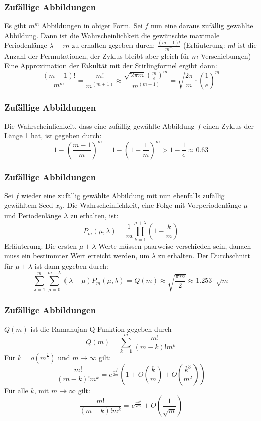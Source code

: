 \documentclass{beamer}
\begin{document}

\begin{frame}
	\frametitle{Zufällige Abbildungen}
	Es gibt \(m^m\) Abbildungen in obiger Form.
	Sei \(f\) nun eine daraus zufällig gewählte Abbildung.
	Dann ist die Wahrscheinlichkeit die gewünschte maximale Periodenlänge \(\lambda=m\) zu erhalten gegeben durch: \(\frac{(m-1)!}{m^m}\)
	(Erläuterung: \(m!\) ist die Anzahl der Permutationen, der Zyklus bleibt aber gleich für \(m\) Verschiebungen) \\
	Eine Approximation der Fakultät mit der Stirlingformel ergibt dann:
	\[
		\frac{(m-1)!}{m^m} = \frac{m!}{m^{(m+1)}} \approx \frac{\sqrt{2 \pi m} \left(\frac{m}{e}\right)^m}{m^{(m+1)}} = \sqrt{\frac{2 \pi}{m}} \cdot \left(\frac{1}e\right)^m
	\]
\end{frame}

\begin{frame}
	\frametitle{Zufällige Abbildungen}
	Die Wahrscheinlichkeit, dass eine zufällig gewählte Abbildung \(f\) einen Zyklus der Länge 1 hat, ist gegeben durch:
	\[
		1-\left(\frac{m-1}{m}\right)^m = 1-\left(1-\frac{1}{m}\right)^m >  1 - \frac{1}{e} \approx 0.63
	\]
\end{frame}


\begin{frame}
	\frametitle{Zufällige Abbildungen}
	Sei \(f\) wieder eine zufällig gewählte Abbildung mit nun ebenfalls zufällig gewähltem Seed \(x_0\).
	Die Wahrscheinlichkeit, eine Folge mit Vorperiodenlänge \(\mu\) und Periodenlänge \(\lambda\) zu erhalten, ist:
	\[
		P_m(\mu,\lambda)=\frac{1}{m}\prod_{k=1}^{\mu + \lambda}\left(1-\frac{k}{m}\right)
	\]
	Erläuterung:
	Die ersten \(\mu + \lambda\) Werte müssen paarweise verschieden sein,
	danach muss ein bestimmter Wert erreicht werden, um \(\lambda\) zu erhalten.
	Der Durchschnitt für \(\mu + \lambda\) ist dann gegeben durch:
	\[
		\sum_{\lambda=1}^{m} \sum_{\mu=0}^{m-\lambda}  (\lambda+\mu) P_m(\mu,\lambda) = Q(m)
		\approx \sqrt{\frac{\pi m}{2}} \approx 1.253 \cdot \sqrt{m}
	\]
\end{frame}


\begin{frame}
	\frametitle{Zufällige Abbildungen}
	\(Q(m)\) ist die Ramanujan Q-Funktion gegeben durch 
	\[
		Q(m)= \sum_{k=1}^m \frac{m!}{(m-k)!m^k}
	\]
	Für \(k=o\left(m^\frac{2}{3}\right)\) und \(m \to \infty\) gilt:
	\[
		\frac{m!}{(m-k)!m^k}=e^\frac{-k^2}{2m} \left( 1 + O\left(\frac{k}{m}\right) + O\left(\frac{k^3}{m^2}\right) \right)
	\]
	Für alle \(k\), mit \(m \to \infty\) gilt:
	\[
		\frac{m!}{(m-k)!m^k}=e^\frac{-k^2}{2m} + O\left(\frac{1}{\sqrt{m}}\right)
	\]
\end{frame}
\end{document}
